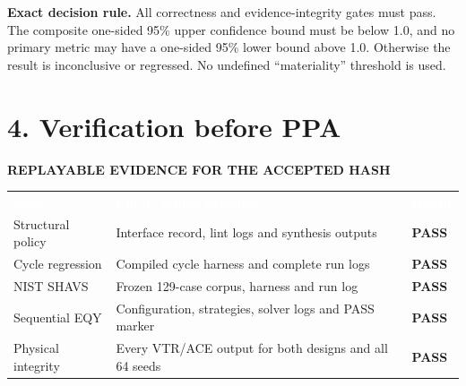 \documentclass[10pt,a4paper]{article}
\newcommand{\hash}[1]{{\scriptsize\ttfamily\seqsplit{#1}}}
\newcommand{\smallcaps}[1]{\textcolor{Mid}{\fontsize{8.5}{10}\selectfont\bfseries\MakeUppercase{#1}}}
\newcommand{\newpageheading}[2]{\clearpage\section{#1}\smallcaps{#2}\vspace{6pt}}
\newcommand{\yes}{\textcolor{GotherBlue}{\textbf{PASS}}}
\newcommand{\thead}[1]{\textcolor{white}{\textbf{#1}}}
\begin{document}
\vspace{8mm}
\begin{center}
\end{center}

\begin{scopebox}
\textbf{Exact decision rule.} All correctness and evidence-integrity gates must pass. The composite one-sided 95\% upper confidence bound must be below 1.0, and no primary metric may have a one-sided 95\% lower bound above 1.0. Otherwise the result is inconclusive or regressed. No undefined ``materiality'' threshold is used.
\end{scopebox}

\newpageheading{4. Verification before PPA}{Replayable evidence for the accepted hash}

{\small
{}
\begin{tabularx}{\textwidth}{@{}P{40mm}Y P{19mm}@{}}
\thead{Gate} & \thead{Public replay evidence} & \thead{Result} \\
Structural policy & Interface record, lint logs and synthesis outputs & \yes \\
Cycle regression & Compiled cycle harness and complete run logs & \yes \\
NIST SHAVS & Frozen 129-case corpus, harness and run log & \yes \\
Sequential EQY & Configuration, strategies, solver logs and PASS marker & \yes \\
Physical integrity & Every VTR/ACE output for both designs and all 64 seeds & \yes \\
\end{tabularx}
}
\end{document}
